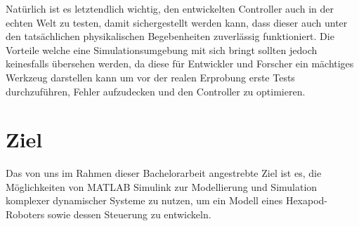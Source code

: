 Natürlich ist es letztendlich wichtig, den entwickelten Controller auch in der echten Welt zu testen, damit sichergestellt werden kann, dass dieser auch unter den tatsächlichen physikalischen Begebenheiten zuverlässig funktioniert.
Die Vorteile welche eine Simulationsumgebung mit sich bringt sollten jedoch keinesfalls übersehen werden, da diese für Entwickler und Forscher ein mächtiges Werkzeug darstellen kann um vor der realen Erprobung erste Tests durchzuführen, Fehler aufzudecken und den Controller zu optimieren.



\section{Ziel}
Das von uns im Rahmen dieser Bachelorarbeit angestrebte Ziel ist es, die Möglichkeiten von MATLAB Simulink zur Modellierung und Simulation komplexer dynamischer Systeme zu nutzen, um ein Modell eines Hexapod-Roboters sowie dessen Steuerung zu entwickeln.

